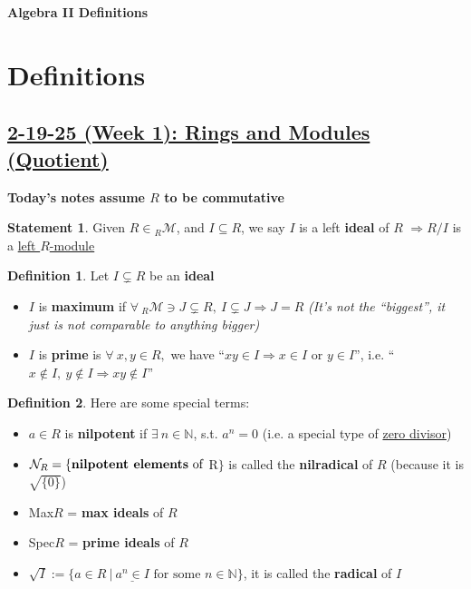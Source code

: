 \documentclass[12pt,a4paper]{article}
\theoremstyle{definition}
\newtheorem{definition}{Definition}[subsection]
\newtheorem{statement}{Statement}[subsection]
\begin{document}
\begin{center}
  {\Large \bf Algebra II Definitions}\\[6pt]
\end{center}

\section*{Definitions}
\setcounter{definition}{0}
\setcounter{statement}{0}
\subsection*{\underline{\textbf{2-19-25 (Week 1): Rings and Modules (Quotient)}}}
\textbf{Today's notes assume $R$ to be commutative}
\begin{statement}
  Given $R \in\text{}_R\mathcal{M}$, and $I \subseteq R$, we say $I$ is a left \textbf{ideal} of $R$ $\Rightarrow \boxed{R/I}$ is a \underline{left $R$-module}
\end{statement}
\vspace{0.125em}

\begin{definition}
Let $I \subsetneq R$ be an \textbf{ideal}
  \begin{itemize}
    \item $I$ is \textbf{maximum} if $\forall\ \text{}_R\mathcal{M} \ni J \subsetneq R,\ I \subsetneq J \Rightarrow J = R$ \textit{(It's not the ``biggest'', it just is not comparable to anything bigger)}
    \item $I$ is \textbf{prime} is $\forall\ x, y \in R,$ we have ``$xy \in I \Rightarrow x \in I \text{ or } y \in I$'', i.e. ``$x \notin I,\ y \notin I \Rightarrow xy \notin I$''
  \end{itemize}
\end{definition}
\vspace{0.125em}

\begin{definition}
  Here are some special terms:
  \begin{itemize}
    \item $a \in R$ is \textbf{nilpotent} if $\exists\ n \in \mathbb{N}$, s.t. $a^n = 0$ (i.e. a special type of \underline{zero divisor})
    \item $\mathcal{N}_R = \{\text{\textbf{nilpotent elements} of } $R$\}$ is called the \textbf{nilradical} of $R$ (because it is $\sqrt{\{0\}}$)
    \item Max$R$ = {\textbf{max ideals} of $R$}
    \item Spec$R$ = {\textbf{prime ideals} of $R$}
    \item $\sqrt{I} := \{a \in R \ | \ \underline{a^n \in I} \text{ for some } n \in \mathbb{N}\}$, it is called the \textbf{radical} of $I$
  \end{itemize}
\end{definition}
\vspace{0.125em}
\end{document}
